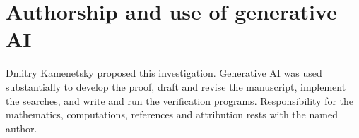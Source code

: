\documentclass[11pt]{article}
\begin{document}

\section*{Authorship and use of generative AI}
Dmitry Kamenetsky proposed this investigation. Generative AI was used substantially to develop the proof, draft and revise the manuscript, implement the searches, and write and run the verification programs. Responsibility for the mathematics, computations, references and attribution rests with the named author.
\clearpage

\clearpage
\appendix

\end{document}
